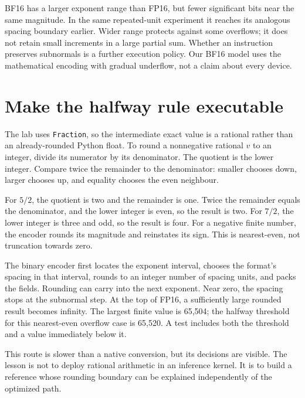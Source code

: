BF16 has a larger exponent range than FP16, but fewer significant
bits near the same magnitude. In the same repeated-unit experiment
it reaches its analogous spacing boundary earlier. Wider range
protects against some overflows; it does not retain small increments
in a large partial sum. Whether an instruction preserves subnormals
is a further execution policy. Our BF16 model uses the mathematical
encoding with gradual underflow, not a claim about every device.

\section{Make the halfway rule executable}
The lab uses \texttt{Fraction}, so the intermediate exact value is a
rational rather than an already-rounded Python float. To round a
nonnegative rational $v$ to an integer, divide its numerator by its
denominator. The quotient is the lower integer. Compare twice the
remainder to the denominator: smaller chooses down, larger chooses
up, and equality chooses the even neighbour.

\begin{minipage}{\linewidth}
\end{minipage}

For $5/2$, the quotient is two and the remainder is one. Twice the
remainder equals the denominator, and the lower integer is even,
so the result is two. For $7/2$, the lower integer is three and
odd, so the result is four. For a negative finite number, the
encoder rounds its magnitude and reinstates its sign. This is
nearest-even, not truncation towards zero.

The binary encoder first locates the exponent interval, chooses
the format's spacing in that interval, rounds to an integer
number of spacing units, and packs the fields. Rounding can carry
into the next exponent. Near zero, the spacing stops at the subnormal
step. At the top of FP16, a sufficiently large rounded result becomes
infinity. The largest finite value is 65,504; the halfway threshold
for this nearest-even overflow case is 65,520. A test includes
both the threshold and a value immediately below it.

This route is slower than a native conversion, but its decisions
are visible. The lesson is not to deploy rational arithmetic in
an inference kernel. It is to build a reference whose rounding
boundary can be explained independently of the optimized path.

